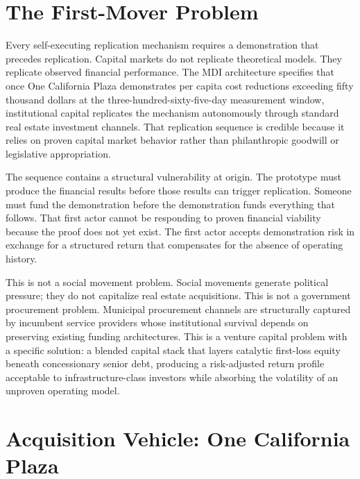 \documentclass[12pt, letterpaper]{article}
\begin{document}
\newpage
\begingroup
{}
\setlength{\cftbeforesecskip}{2pt}
\setlength{\cftbeforesubsecskip}{-2pt}
\tableofcontents
\endgroup
\clearpage
{}

\clearpage
\section{The First-Mover Problem}

Every self-executing replication mechanism requires a demonstration that precedes replication. Capital markets do not replicate theoretical models. They replicate observed financial performance. The MDI architecture specifies that once One California Plaza demonstrates per capita cost reductions exceeding fifty thousand dollars at the three-hundred-sixty-five-day measurement window, institutional capital replicates the mechanism autonomously through standard real estate investment channels. That replication sequence is credible because it relies on proven capital market behavior rather than philanthropic goodwill or legislative appropriation.

The sequence contains a structural vulnerability at origin. The prototype must produce the financial results before those results can trigger replication. Someone must fund the demonstration before the demonstration funds everything that follows. That first actor cannot be responding to proven financial viability because the proof does not yet exist. The first actor accepts demonstration risk in exchange for a structured return that compensates for the absence of operating history.

This is not a social movement problem. Social movements generate political pressure; they do not capitalize real estate acquisitions. This is not a government procurement problem. Municipal procurement channels are structurally captured by incumbent service providers whose institutional survival depends on preserving existing funding architectures. This is a venture capital problem with a specific solution: a blended capital stack that layers catalytic first-loss equity beneath concessionary senior debt, producing a risk-adjusted return profile acceptable to infrastructure-class investors while absorbing the volatility of an unproven operating model.

\clearpage
\section{Acquisition Vehicle: One California Plaza}
\end{document}

